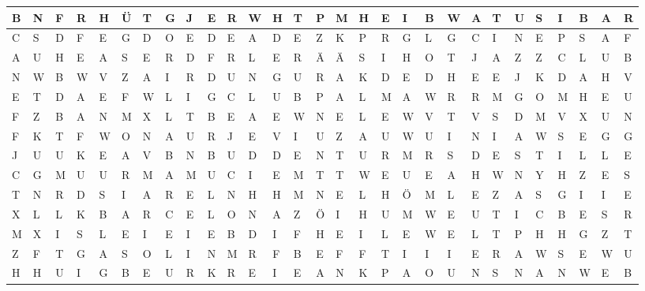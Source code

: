\begin{center}
	\footnotesize
	\setlength{\tabcolsep}{0.3em}
	\begin{tabular}{| *{29}{>{\centering\arraybackslash}m{1.1em} |}}
		\hline
		B & N & F & R & H & Ü & T & G & J & E & R & W & H & T & P & M & H & E
			& I & B & W & A & T & U & S & I & B & A & R
		\\ \hline
		C & S & D & F & E & G & D & O & E & D & E & A & D & E & Z & K & P & R
			& G & L & G & C & I & N & E & P & S & A & F
		\\ \hline
		A & U & H & E & A & S & E & R & D & F & R & L & E & R & Ä & Ä & S & I
			& H & O & T & J & A & Z & Z & C & L & U & B
		\\ \hline
		N & W & B & W & V & Z & A & I & R & D & U & N & G & U & R & A & K & D
			& E & D & H & E & E & J & K & D & A & H & V
		\\ \hline
		E & T & D & A & E & F & W & L & I & G & C & L & U & B & P & A & L & M
			& A & W & R & R & M & G & O & M & H & E & U
		\\ \hline
		F & Z & B & A & N & M & X & L & T & B & E & A & E & W & N & E & L & E
			& W & V & T & V & S & D & M & V & X & U & N
		\\ \hline
		F & K & T & F & W & O & N & A & U & R & J & E & V & I & U & Z & A & U
			& W & U & I & N & I & A & W & S & E & G & G
		\\ \hline
		J & U & U & K & E & A & V & B & N & B & U & D & D & E & N & T & U & R
			& M & R & S & D & E & S & T & I & L & L & E
		\\ \hline
		C & G & M & U & U & R & M & A & M & U & C & I & E & M & T & T & W & E
			& U & E & A & H & W & N & Y & H & Z & E & S
		\\ \hline
		T & N & R & D & S & I & A & R & E & L & N & H & H & M & N & E & L & H
			& Ö & M & L & E & Z & A & S & G & I & I & E
		\\ \hline
		X & L & L & K & B & A & R & C & E & L & O & N & A & Z & Ö & I & H & U
			& M & W & E & U & T & I & C & B & E & S & R
		\\ \hline
		M & X & I & S & L & E & I & E & I & E & B & D & I & F & H & E & I & L
			& E & W & E & L & T & P & H & H & G & Z & T
		\\ \hline
		Z & F & T & G & A & S & O & L & I & N & M & R & F & B & E & F & F & T
			& I & I & I & E & R & A & W & S & E & W & U
		\\ \hline
		H & H & U & I & G & B & E & U & R & K & R & E & I & E & A & N & K & P
			& A & O & U & N & S & N & A & N & W & E & B

\end{tabular}
\end{center}
